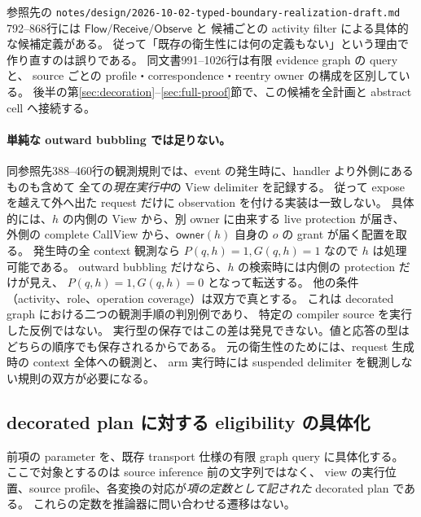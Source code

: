 \documentclass[11pt,a4paper]{article}
\begin{document}
参照先の \texttt{notes/design/2026-10-02-typed-boundary-realization-draft.md}
792--868行には \(\mathsf{Flow}/\mathsf{Receive}/\mathsf{Observe}\) と
候補ごとの activity filter による具体的な候補定義がある。
従って「既存の衛生性には何の定義もない」という理由で作り直すのは誤りである。
同文書991--1026行は有限 evidence graph の query と、
source ごとの profile・correspondence・reentry owner の構成を区別している。
後半の第\ref{sec:decoration}--\ref{sec:full-proof}節で、この候補を全計画と abstract cell へ接続する。

\paragraph{単純な outward bubbling では足りない。}
同参照先388--460行の観測規則では、event の発生時に、handler より外側にあるものも含めて
全ての\emph{現在実行中}の View delimiter を記録する。
従って expose を越えて外へ出た request だけに observation を付ける実装は一致しない。
具体的には、\(h\) の内側の View から、別 owner に由来する live protection が届き、
外側の complete CallView から、\(\mathsf{owner}(h)\) 自身の \(o\) の grant が届く配置を取る。
発生時の全 context 観測なら \(P(q,h)=1,G(q,h)=1\) なので \(h\) は処理可能である。
outward bubbling だけなら、\(h\) の検索時には内側の protection だけが見え、
\(P(q,h)=1,G(q,h)=0\) となって転送する。
他の条件（activity、role、operation coverage）は双方で真とする。
これは decorated graph における二つの観測手順の判別例であり、
特定の compiler source を実行した反例ではない。
実行型の保存ではこの差は発見できない。値と応答の型はどちらの順序でも保存されるからである。
元の衛生性のためには、request 生成時の context 全体への観測と、
arm 実行時には suspended delimiter を観測しない規則の双方が必要になる。

\subsection{decorated plan に対する eligibility の具体化}
\label{sec:concrete-eligibility}

前項の parameter を、既存 transport 仕様の有限 graph query に具体化する。
ここで対象とするのは source inference 前の文字列ではなく、
view の実行位置、source profile、各変換の対応が\emph{項の定数として記された} decorated plan である。
これらの定数を推論器に問い合わせる遷移はない。
\end{document}

